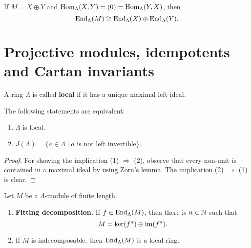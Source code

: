 
\begin{remark}
If $M=X\oplus Y$ and $\operatorname{Hom}_\Lambda(X,Y)=(0)=\operatorname{Hom}_\Lambda(Y,X)$, then
\[
\operatorname{End}_\Lambda(M)\cong \operatorname{End}_\Lambda(X)\oplus\operatorname{End}_\Lambda(Y).
\]
\end{remark}



\section{Projective modules, idempotents and Cartan invariants}


\begin{definition}
A ring $\Lambda$ is called \textbf{local} if it has a unique maximal left ideal.
\end{definition}


\begin{lemma}\label{1.4.1}
The following statements are equivalent:
\begin{enumerate}
\item $\Lambda$ is local.
\item $J(\Lambda)=\{a\in\Lambda\mid a \text{ is not left invertible}\}$.
\end{enumerate}
\end{lemma}


\begin{proof}
For showing the implication (1) $\Rightarrow$ (2), observe that every non-unit is contained in a maximal ideal by using Zorn's lemma. The implication (2) $\Rightarrow$ (1) is clear.
\end{proof}


\begin{lemma}\label{1.4.2}
Let $M$ be a $\Lambda$-module of finite length.
\begin{enumerate}
\item \textbf{\textup{Fitting decomposition.}} If $f\in\operatorname{End}_\Lambda(M)$, then there is $n\in\mathbb{N}$ such that
\[
M = \ker(f^n) \oplus \operatorname{im}(f^n).
\]
\item If $M$ is indecomposable, then $\operatorname{End}_\Lambda(M)$ is a local ring.
\end{enumerate}
\end{lemma}

